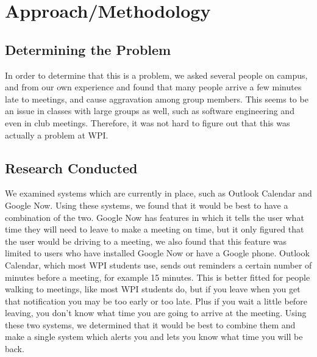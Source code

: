 \section{Approach/Methodology}

\subsection{Determining the Problem}
In order to determine that this is a problem, we asked several people on campus, and from our own experience and found that many people arrive a few minutes late to meetings, and cause aggravation among group members. This seems to be an issue in classes with large groups as well, such as software engineering and even in club meetings. Therefore, it was not hard to figure out that this was actually a problem at WPI. 

\subsection{Research Conducted}
 We examined systems which are currently in place, such as Outlook Calendar and Google Now. Using these systems, we found that it would be best to have a combination of the two. Google Now has features in which it tells the user what time they will need to leave to make a meeting on time, but it only figured that the user would be driving to a meeting, we also found that this feature was limited to users who have installed Google Now or have a Google phone. Outlook Calendar, which most WPI students use, sends out reminders a certain number of minutes before a meeting, for example 15 minutes. This is better fitted for people walking to meetings, like most WPI students do, but if you leave when you get that notification you may be too early or too late. Plus if you wait a little before leaving, you don't know what time you are going to arrive at the meeting. Using these two systems, we determined that it would be best to combine them and make a single system which alerts you and lets you know what time you will be back. 

